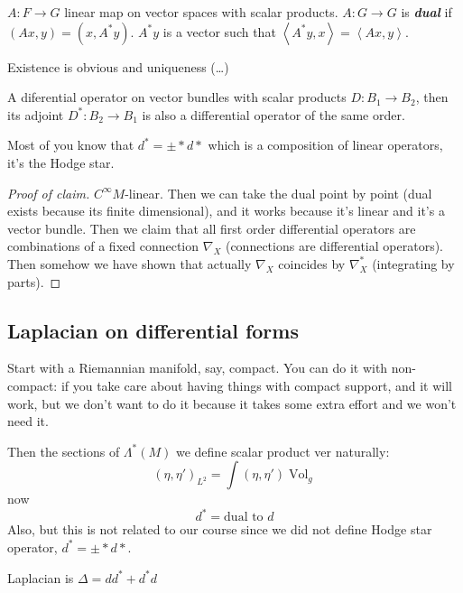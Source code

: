 \begin{defn}\leavevmode
\(A: F \to G\) linear map on vector spaces with scalar products. \(A: G \to G\) is \textit{\textbf{dual}} if \((Ax,y)=(x,A^*y)\). \(A^*y\) is a vector such that \(\left<A^*y,x\right>=\left<Ax,y\right>\).
\end{defn}

Existence is obvious and uniqueness (…)

\begin{claim}\leavevmode
A diferential operator on vector bundles with scalar products \(D : B_1 \to B_2\), then its adjoint \(D^*:B_2 \to B_1\) is also a differential operator of the same order.
\end{claim}

\begin{remark}\leavevmode
Most of you know that \(d^*=\pm  * d *\) which is a composition of linear operators, it's the Hodge star.
\end{remark}

\begin{proof}[Proof of claim]\leavevmode
\(C^\infty M\)-linear. Then we can take the dual point by point (dual exists because its finite dimensional), and it works because it's linear and it's a vector bundle. Then we claim that all first order differential operators are combinations of a fixed connection \(\nabla_X\) (connections are differential operators). Then somehow we have shown that actually \(\nabla_X \) coincides by \(\nabla_X^*\) (integrating by parts).
\end{proof}

\subsection{Laplacian on differential forms}

Start with a Riemannian manifold, say, compact. You can do it with non-compact: if you take care about having things with compact support, and it will work, but we don't want to do it because it takes some extra effort and we won't need it.

Then the sections of \(\Lambda^{*}(M)\) we define scalar product ver naturally:
 \[(\eta,\eta')_{L^2}=\int(\eta,\eta')\operatorname{Vol}_g\]
 now
 \[d^* = \text{dual to $d$} \]
 Also, but this is not related to our course since we did not define Hodge star operator, \(d^*=\pm  * d *\).
 
\begin{defn}\leavevmode
Laplacian is \(\Delta=dd^*+ d^*d\)
\end{defn}

